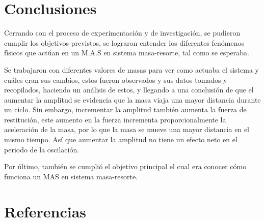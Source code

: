 \documentclass[spanish,notitlepage,letterpaper, 12pt]{article}
\begin{document}
\section{Conclusiones}
Cerrando con el proceso de experimentación y de investigación, se pudieron cumplir los objetivos previstos, se lograron entender los diferentes fenómenos físicos que actúan en un M.A.S en sistema masa-resorte, tal como se esperaba.\par
\bigskip
Se trabajaron con diferentes valores de masas para ver como actuaba
el sistema y cuáles eran sus cambios, estos fueron observados y sus datos tomados y recopilados, haciendo un análisis de estos, y llegando a una conclusión de que el aumentar la amplitud se evidencia que la masa viaja una mayor distancia durante un ciclo. Sin embargo, incrementar la amplitud también
aumenta la fuerza de restitución, este aumento en la fuerza incrementa proporcionalmente la aceleración de la masa, por lo que la masa se mueve una mayor distancia en el mismo tiempo. Así que aumentar la amplitud no tiene un efecto neto en el periodo de la oscilación.\par
\bigskip
Por último, también se cumplió el objetivo principal el cual era conocer cómo funciona un MAS en sistema masa-resorte.
\section{Referencias} 


\end{document}
